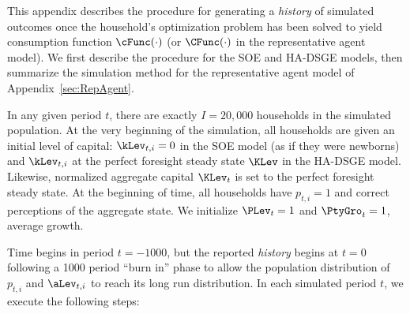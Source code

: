 
This appendix describes the procedure for generating a \textit{history}
of simulated outcomes once the household's optimization problem has
been solved to yield consumption function $\cFunc(\cdot)$ (or $\CFunc(\cdot)$
in the representative agent model).  We first describe the procedure for
the SOE and HA-DSGE models, then summarize
the simulation method for the representative agent model of Appendix~\ref{sec:RepAgent}.

In any given period $t$, there are exactly $I=20,000$ households in
the simulated population.  At the very beginning of the simulation, all households
are given an initial level of capital: $\kLev_{t,i} = 0$ in the SOE model (as if
they were newborns) and $\kLev_{t,i}$ at the perfect foresight steady state $\KLev$ in the HA-DSGE model.
Likewise, normalized aggregate capital $\KLev_{t}$ is set to the perfect foresight
steady state.  At the beginning of time, all households
have $p_{t,i} = 1$ and correct perceptions of the aggregate state.
We initialize $\PLev_{t}=1$ and $\PtyGro_{t}=1$, average growth.

Time begins in period $t=-1000$, but the reported \textit{history}
begins at $t=0$ following a 1000 period ``burn in'' phase to allow the
population distribution of $p_{t,i}$ and $\aLev_{t,i}$ to reach its
long run distribution.  In each simulated period $t$, we execute the following steps:


